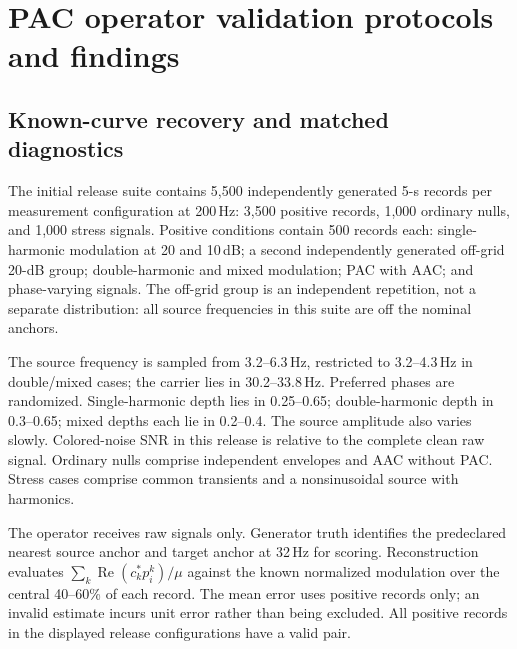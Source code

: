\documentclass[10pt,twocolumn,letterpaper]{article}
\begin{document}
\section{PAC operator validation protocols and findings}
\label{app:operator-validation}
\subsection{Known-curve recovery and matched diagnostics}
The initial release suite contains 5,500 independently generated
5-s records per measurement configuration at 200\,Hz: 3,500 positive
records, 1,000 ordinary nulls, and 1,000 stress signals. Positive
conditions contain 500 records each: single-harmonic modulation at
20 and 10\,dB; a second independently generated off-grid 20-dB group;
double-harmonic and mixed modulation; PAC with AAC; and phase-varying
signals. The off-grid group is an independent repetition, not a
separate distribution: all source frequencies in this suite are
off the nominal anchors.

The source frequency is sampled from 3.2--6.3\,Hz, restricted to
3.2--4.3\,Hz in double/mixed cases; the carrier lies in
30.2--33.8\,Hz. Preferred phases are randomized. Single-harmonic
depth lies in 0.25--0.65; double-harmonic depth in 0.3--0.65;
mixed depths each lie in 0.2--0.4. The source amplitude also varies
slowly. Colored-noise SNR in this release is relative to the complete
clean raw signal. Ordinary nulls comprise independent envelopes and
AAC without PAC. Stress cases comprise common transients and a
nonsinusoidal source with harmonics.

The operator receives raw signals only. Generator truth identifies the
predeclared nearest source anchor and target anchor at 32\,Hz for
scoring. Reconstruction evaluates
$\sum_k\operatorname{Re}(c_k^*p_i^k)/\mu$ against the known
normalized modulation over the central 40--60\% of each record.
The mean error uses positive records only; an invalid estimate incurs
unit error rather than being excluded. All positive records in the
displayed release configurations have a valid pair.
\end{document}
